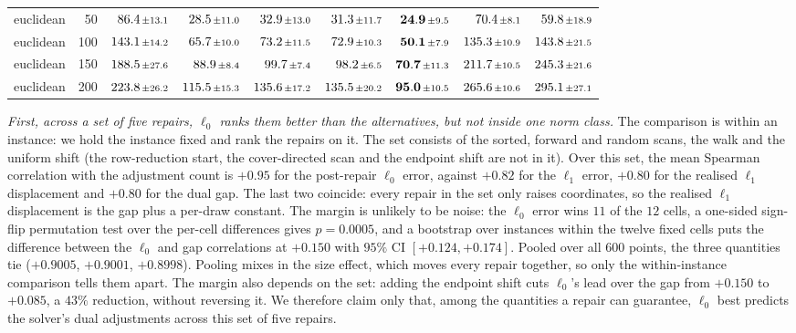\begin{table}[ht]
\begin{tabular}{lrrrrrrrr}
euclidean & 50 & $86.4{\scriptstyle\,\pm13.1}$ & $28.5{\scriptstyle\,\pm11.0}$ & $32.9{\scriptstyle\,\pm13.0}$ & $31.3{\scriptstyle\,\pm11.7}$ & $\mathbf{24.9}{\scriptstyle\,\pm9.5}$ & $70.4{\scriptstyle\,\pm8.1}$ & $59.8{\scriptstyle\,\pm18.9}$ \\
euclidean & 100 & $143.1{\scriptstyle\,\pm14.2}$ & $65.7{\scriptstyle\,\pm10.0}$ & $73.2{\scriptstyle\,\pm11.5}$ & $72.9{\scriptstyle\,\pm10.3}$ & $\mathbf{50.1}{\scriptstyle\,\pm7.9}$ & $135.3{\scriptstyle\,\pm10.9}$ & $143.8{\scriptstyle\,\pm21.5}$ \\
euclidean & 150 & $188.5{\scriptstyle\,\pm27.6}$ & $88.9{\scriptstyle\,\pm8.4}$ & $99.7{\scriptstyle\,\pm7.4}$ & $98.2{\scriptstyle\,\pm6.5}$ & $\mathbf{70.7}{\scriptstyle\,\pm11.3}$ & $211.7{\scriptstyle\,\pm10.5}$ & $245.3{\scriptstyle\,\pm21.6}$ \\
euclidean & 200 & $223.8{\scriptstyle\,\pm26.2}$ & $115.5{\scriptstyle\,\pm15.3}$ & $135.6{\scriptstyle\,\pm17.2}$ & $135.5{\scriptstyle\,\pm20.2}$ & $\mathbf{95.0}{\scriptstyle\,\pm10.5}$ & $265.6{\scriptstyle\,\pm10.6}$ & $295.1{\scriptstyle\,\pm27.1}$ \\
\bottomrule
\end{tabular}
\end{table}

\emph{First, across a set of five repairs, $\ell_0$ ranks them better than the alternatives, but
not inside one norm class.} The comparison is within an instance: we hold the instance fixed and
rank the repairs on it. The set consists of the sorted, forward and random scans, the walk and the uniform shift
(the row-reduction start, the cover-directed scan and the endpoint shift are not in it). Over this
set, the mean Spearman correlation with the adjustment count is $+0.95$ for the post-repair
$\ell_0$ error, against $+0.82$ for the $\ell_1$ error, $+0.80$ for the realised $\ell_1$
displacement and $+0.80$ for the dual gap. The last two coincide: every repair in the set only
raises coordinates, so the realised $\ell_1$ displacement is the gap plus a per-draw constant. The
margin is unlikely to be noise: the $\ell_0$ error wins $11$ of the $12$ cells, a one-sided sign-flip
permutation test over the per-cell differences gives $p = 0.0005$, and a bootstrap over instances
within the twelve fixed cells puts the difference between the $\ell_0$ and gap correlations at $+0.150$ with $95\%$ CI
$[+0.124, +0.174]$. Pooled over all $600$ points, the three quantities tie ($+0.9005$, $+0.9001$,
$+0.8998$). Pooling mixes in the size effect, which moves every repair together, so only the
within-instance comparison tells them apart. The margin also depends on the set: adding the
endpoint shift cuts $\ell_0$'s lead over the gap from $+0.150$ to $+0.085$, a $43\%$ reduction,
without reversing it. We therefore claim only that, among the quantities a repair can
guarantee, $\ell_0$ best predicts the solver's dual adjustments across this set of five repairs.

